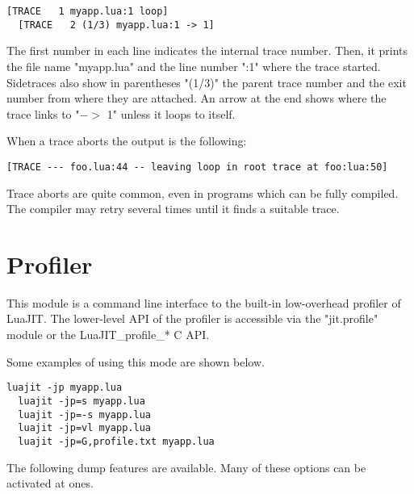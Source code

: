 \begin{lstlisting}[style=CommandsLuaJIT]
  [TRACE   1 myapp.lua:1 loop]
  [TRACE   2 (1/3) myapp.lua:1 -> 1]
\end{lstlisting}

\noindent
The first number in each line indicates the internal trace number. Then, it prints  the file name "myapp.lua" and the line number ":1" where the trace started. Sidetraces also show in parentheses "(1/3)" the parent trace number and the exit number from where they are attached.
An arrow at the end shows where the trace links to "$->$ 1" unless it loops to itself.

When a trace aborts the output is the following:
\begin{lstlisting}[style=CommandsLuaJIT]
[TRACE --- foo.lua:44 -- leaving loop in root trace at foo:lua:50]
\end{lstlisting}

\noindent
Trace aborts are quite common, even in programs which
can be fully compiled. The compiler may retry several times until it finds a suitable trace.



\section{Profiler}
\label{Sec:Profiler}

This module is a command line interface to the built-in
low-overhead profiler of LuaJIT. The lower-level API of the profiler is accessible via the "jit.profile" module or the LuaJIT\_profile\_* C API.

Some examples of using this mode are shown below.
\begin{lstlisting}[style=CommandsLuaJIT]
  luajit -jp myapp.lua
  luajit -jp=s myapp.lua
  luajit -jp=-s myapp.lua
  luajit -jp=vl myapp.lua
  luajit -jp=G,profile.txt myapp.lua
\end{lstlisting}
The following dump features are available. Many of these options can be activated at ones.


